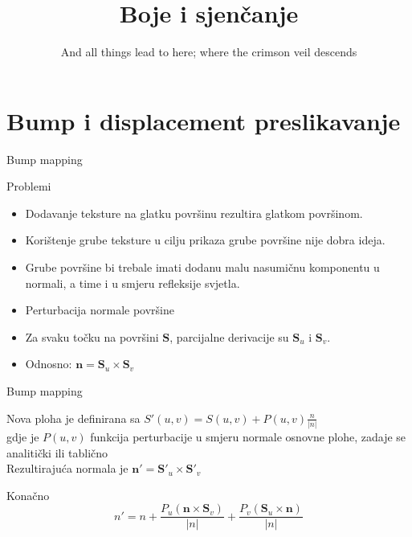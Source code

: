 \documentclass[9pt]{beamer}
\title{Boje i sjenčanje}
\subtitle {And all things lead to here; where the crimson veil descends}
\institute{Računalna grafika}
\begin{document}
\begin{frame}
 \titlepage
\end{frame}

\section{Bump i displacement preslikavanje}
\begin{frame}{Bump mapping}
	\begin{block}{Problemi}
		\begin{itemize}
			\item Dodavanje teksture na glatku površinu rezultira glatkom površinom.
			\item Korištenje grube teksture u cilju prikaza grube površine nije dobra ideja.
			\item Grube površine bi trebale imati dodanu malu nasumičnu komponentu u normali, a time i u smjeru refleksije svjetla.
		\end{itemize}
	\end{block}
	\begin{itemize}
		\item Perturbacija normale površine
		\item Za svaku točku na površini $\mathbf{S}$, parcijalne derivacije su $\mathbf{S}_u$ i $\mathbf{S}_v$. 
		\item Odnosno: $\mathbf{n} = \mathbf{S}_u \times\mathbf{S}_v$
	\end{itemize}
\end{frame}	
%
\begin{frame}{Bump mapping}
	\begin{block}{}
		Nova ploha je definirana sa $S'(u,v) = S(u,v) + P(u,v)\frac{n}{|n|}$ \\
		gdje je $P(u,v)$ funkcija perturbacije u smjeru normale osnovne plohe, zadaje se analitički ili tablično\\
		Rezultirajuća normala je $\mathbf{n'} = \mathbf{S'}_{u} \times \mathbf{S'}_{v}$ 
	\end{block}
	
	\begin{block}{Konačno}
		$$n' = n + \frac{P_{u}(\mathbf{n} \times \mathbf{S}_{v})}{|n|} + \frac{P_{v}(\mathbf{S}_{u} \times \mathbf{n})}{|n|}$$
	\end{block}
\end{frame}
\end{document}
